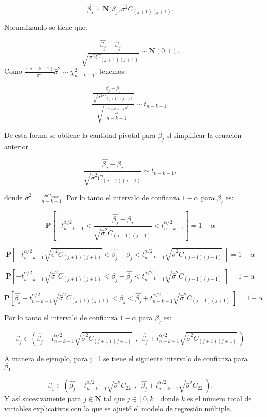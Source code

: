 \documentclass[
  a4paper,
  oneside,
  openany]{book}
\begin{document}
\[\hat{\beta_{j}} \sim \mathbf{N}(\beta_{j}, \sigma^2C_{(j+1)(j+1)}.\]

Normalizando se tiene que:

\[\frac{\hat{\beta_{j}}-\beta_{j}}{\sqrt{\sigma^2C_{(j+1)(j+1)}}}\sim \mathbf{N}(0,1).\]
Como \(\frac{(n-k-1)}{\sigma^2}\hat{\sigma}^2 \sim \chi^2_{n-k-1}\), tenemos:

\[\frac{\frac{\hat{\beta_{j}}-\beta_{j}}{\sqrt{\sigma^2C_{(j+1)(j+1)}}}}{\sqrt{\frac{\frac{(n-k-1)\hat{\sigma}^2}{\sigma^2}}{n-k-1}}} \sim t_{n-k-1}.\]

De esta forma se obtiene la cantidad pivotal para \(\beta_{j}\) sl simplificar la ecuación anterior

\[\frac{\hat{\beta_{j}}-\beta_{j}}{\sqrt{\hat{\sigma}^2C_{(j+1)(j+1)}}}\sim t_{n-k-1},\]

donde \(\hat{\sigma}^2=\frac{SC_{error}}{n-k-1}\). Por lo tanto el intervalo de confianza \(1-\alpha\) para \(\beta_{j}\) es:

\[\mathbf{P} \left[-t^{\alpha/2}_{n-k-1} < \frac{\hat{\beta_{j}}-\beta_{j}}{\sqrt{\hat{\sigma}^2C_{(j+1)(j+1)}}} < t^{\alpha/2}_{n-k-1} \right]= 1- \alpha\]

\[\mathbf{P} \left[-t^{\alpha/2}_{n-k-1}{\sqrt{\hat{\sigma}^2C_{(j+1)(j+1)}}} < \hat{\beta_{j}}-\beta_{j} < t^{\alpha/2}_{n-k-1}{\sqrt{\hat{\sigma}^2C_{(j+1)(j+1)}}} \  \right]= 1- \alpha\]

\[\mathbf{P} \left[-t^{\alpha/2}_{n-k-1}{\sqrt{\hat{\sigma}^2C_{(j+1)(j+1)}}} < \beta_{j}-\hat{\beta_{j}} < t^{\alpha/2}_{n-k-1}{\sqrt{\hat{\sigma}^2C_{(j+1)(j+1)}}}  \ \right]= 1- \alpha\]

\[\mathbf{P} \left[\hat{\beta_{j}}-t^{\alpha/2}_{n-k-1}{\sqrt{\hat{\sigma}^2C_{(j+1)(j+1)}}} < \beta_{j} < \hat{\beta_{j}}+t^{\alpha/2}_{n-k-1}{\sqrt{\hat{\sigma}^2C_{(j+1)(j+1)}}}  \ \right]= 1- \alpha\]

Por lo tanto el intervalo de confianza \(1-\alpha\) para \(\beta_{j}\) es:

\[\beta_{j} \in \left(\hat{\beta_{j}}-t^{\alpha/2}_{n-k-1}{\sqrt{\hat{\sigma}^2C_{(j+1)(j+1)}}} \ \ , \ \ \hat{\beta_{j}}+t^{\alpha/2}_{n-k-1}{\sqrt{\hat{\sigma}^2C_{(j+1)(j+1)}}} \ \right)\]

A manera de ejemplo, para j=1 se tiene el siguiente intervalo de confianza para \(\beta_1\)

\[\beta_{1} \in \left(\hat{\beta_{j}}-t^{\alpha/2}_{n-k-1}{\sqrt{\hat{\sigma}^2C_{22}}} \ \ , \ \ \hat{\beta_{j}}+t^{\alpha/2}_{n-k-1}{\sqrt{\hat{\sigma}^2C_{22}}} \  \right).\]
Y así sucesivamente para \(j \in \mathbf{N}\) tal que \(j \in [0,k]\) donde \(k\) es el número total de variables explicativas con la que se ajustó el modelo de regresión múltiple.
\end{document}
